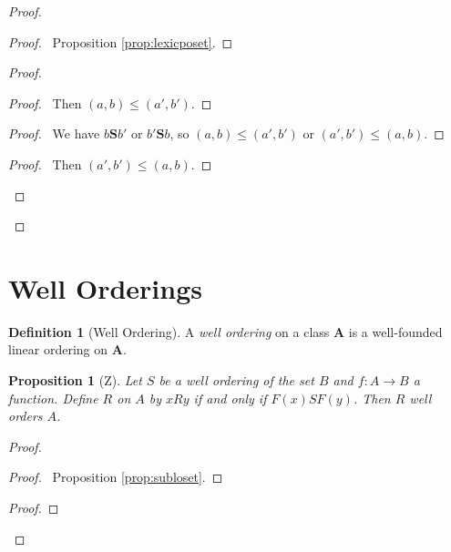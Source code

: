 \documentclass{book}
\let\qed\relax
\newtheorem{prop}[ax]{Proposition}
\theoremstyle{definition}
\newtheorem{df}[ax]{Definition}
\begin{document}
\begin{proof}
\pf
{}
\begin{proof}
	\pf\ Proposition \ref{prop:lexicposet}.
\end{proof}
\begin{proof}
	\begin{proof}
		\pf\ Then $(a,b) \leq (a',b')$.
	\end{proof}
	\begin{proof}
		\pf\ We have $b \mathbf{S} b'$ or $b' \mathbf{S} b$, so $(a,b) \leq (a',b')$ or $(a',b') \leq (a,b)$.
	\end{proof}
	\begin{proof}
		\pf\ Then $(a',b') \leq (a,b)$.
	\end{proof}
\end{proof}
\qed
\end{proof}

\section{Well Orderings}

\begin{df}[Well Ordering]
A \emph{well ordering} on a class $\mathbf{A}$ is a well-founded linear ordering on $\mathbf{A}$.
\end{df}

\begin{prop}[Z]
Let $S$ be a well ordering of the set $B$ and $f : A \rightarrow B$ a function. Define $R$ on $A$ by $xRy$ if and only if $F(x) S F(y)$. Then $R$ well orders $A$.
\end{prop}

\begin{proof}
\pf
{}
\begin{proof}
	\pf\ Proposition \ref{prop:subloset}.
\end{proof}
\begin{proof}
\end{proof}
\qed
\end{proof}
\end{document}
